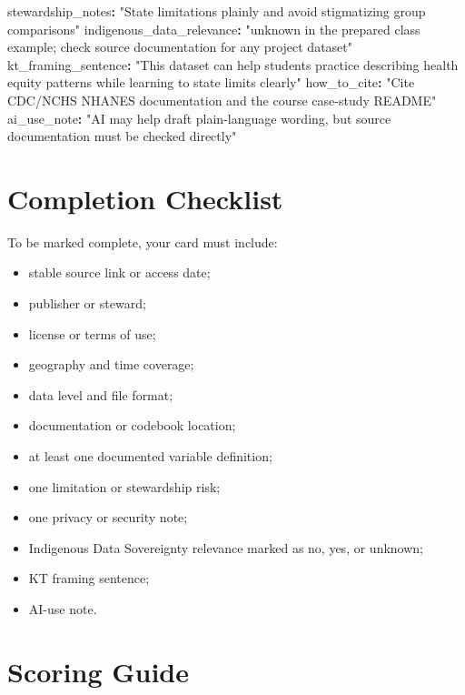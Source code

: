 \documentclass[
  letterpaper,
  DIV=11,
  numbers=noendperiod,
  oneside]{scrreprt}
\newenvironment{Shaded}{\begin{snugshade}}{\end{snugshade}}
\newcommand{\AttributeTok}[1]{\textcolor[rgb]{0.40,0.45,0.13}{#1}}
\newcommand{\FunctionTok}[1]{\textcolor[rgb]{0.28,0.35,0.67}{#1}}
\newcommand{\KeywordTok}[1]{\textcolor[rgb]{0.00,0.23,0.31}{\textbf{#1}}}
\newcommand{\StringTok}[1]{\textcolor[rgb]{0.13,0.47,0.30}{#1}}
\providecommand{\tightlist}{%
  \setlength{\itemsep}{0pt}\setlength{\parskip}{0pt}}
\begin{document}
\begin{Shaded}
\begin{Highlighting}[numbers=left,,]
\FunctionTok{stewardship\_notes}\KeywordTok{:}\AttributeTok{ }\StringTok{"State limitations plainly and avoid stigmatizing group comparisons"}
\FunctionTok{indigenous\_data\_relevance}\KeywordTok{:}\AttributeTok{ }\StringTok{"unknown in the prepared class example; check source documentation for any project dataset"}
\FunctionTok{kt\_framing\_sentence}\KeywordTok{:}\AttributeTok{ }\StringTok{"This dataset can help students practice describing health equity patterns while learning to state limits clearly"}
\FunctionTok{how\_to\_cite}\KeywordTok{:}\AttributeTok{ }\StringTok{"Cite CDC/NCHS NHANES documentation and the course case{-}study README"}
\FunctionTok{ai\_use\_note}\KeywordTok{:}\AttributeTok{ }\StringTok{"AI may help draft plain{-}language wording, but source documentation must be checked directly"}
\end{Highlighting}
\end{Shaded}

\section*{Completion Checklist}\label{completion-checklist}


To be marked complete, your card must include:

\begin{itemize}
\tightlist
\item
  stable source link or access date;
\item
  publisher or steward;
\item
  license or terms of use;
\item
  geography and time coverage;
\item
  data level and file format;
\item
  documentation or codebook location;
\item
  at least one documented variable definition;
\item
  one limitation or stewardship risk;
\item
  one privacy or security note;
\item
  Indigenous Data Sovereignty relevance marked as no, yes, or unknown;
\item
  KT framing sentence;
\item
  AI-use note.
\end{itemize}

\section*{Scoring Guide}\label{scoring-guide}
\end{document}
